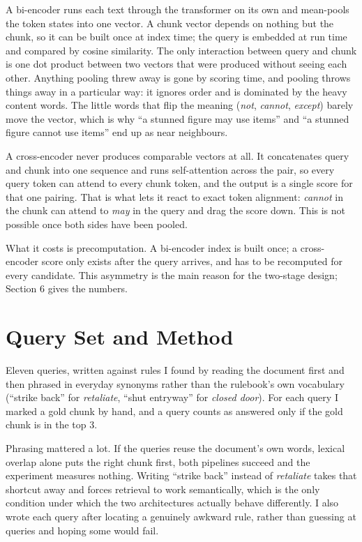 \documentclass[11pt,a4paper]{article}
\begin{document}
A bi-encoder runs each text through the transformer on its own and mean-pools the token
states into one vector. A chunk vector depends on nothing but the chunk, so it can be built
once at index time; the query is embedded at run time and compared by cosine similarity.
The only interaction between query and chunk is one dot product between two vectors that
were produced without seeing each other. Anything pooling threw away is gone by scoring
time, and pooling throws things away in a particular way: it ignores order and is
dominated by the heavy content words. The little words that flip the meaning
(\emph{not}, \emph{cannot}, \emph{except}) barely move the vector, which is why ``a stunned
figure may use items'' and ``a stunned figure cannot use items'' end up as near neighbours.

A cross-encoder never produces comparable vectors at all. It concatenates query and chunk
into one sequence and runs self-attention across the pair, so every query token can attend
to every chunk token, and the output is a single score for that one pairing. That is what
lets it react to exact token alignment: \emph{cannot} in the chunk can attend to \emph{may}
in the query and drag the score down. This is not possible once both sides have been pooled.

What it costs is precomputation. A bi-encoder index is built once; a cross-encoder score
only exists after the query arrives, and has to be recomputed for every candidate. This
asymmetry is the main reason for the two-stage design; Section 6 gives the numbers.

\section{Query Set and Method}

Eleven queries, written against rules I found by reading the document first and then phrased
in everyday synonyms rather than the rulebook's own vocabulary (``strike back'' for
\emph{retaliate}, ``shut entryway'' for \emph{closed door}). For each query I marked a gold
chunk by hand, and a query counts as answered only if the gold chunk is in the top 3.

Phrasing mattered a lot. If the queries reuse the document's own
words, lexical overlap alone puts the right chunk first, both pipelines succeed and the
experiment measures nothing. Writing ``strike back'' instead of \emph{retaliate} takes that
shortcut away and forces retrieval to work semantically, which is the only condition under
which the two architectures actually behave differently. I also wrote each query after
locating a genuinely awkward rule, rather than guessing at queries and hoping some would
fail.
\end{document}
